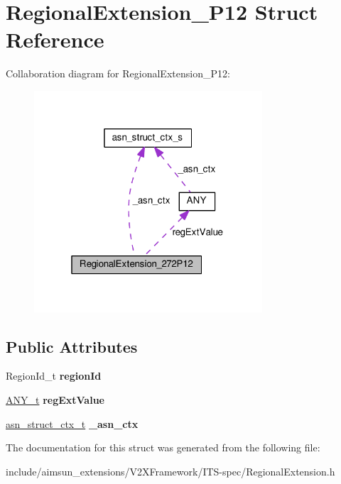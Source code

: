 \hypertarget{structRegionalExtension__272P12}{}\section{Regional\+Extension\+\_\+P12 Struct Reference}
\label{structRegionalExtension__272P12}


Collaboration diagram for Regional\+Extension\+\_\+P12\+:\nopagebreak
\begin{figure}[H]
\begin{center}
\leavevmode
\includegraphics[width=241pt]{structRegionalExtension__272P12__coll__graph}
\end{center}
\end{figure}
\subsection*{Public Attributes}
\begin{DoxyCompactItemize}
\item 
Region\+Id\+\_\+t {\bfseries region\+Id}\hypertarget{structRegionalExtension__272P12_a828c16a3a3567e14b4a5eb7cd425abe1}{}\label{structRegionalExtension__272P12_a828c16a3a3567e14b4a5eb7cd425abe1}

\item 
\hyperlink{structANY}{A\+N\+Y\+\_\+t} {\bfseries reg\+Ext\+Value}\hypertarget{structRegionalExtension__272P12_a123f1e556dc6e0c79d96c2ad8dfef766}{}\label{structRegionalExtension__272P12_a123f1e556dc6e0c79d96c2ad8dfef766}

\item 
\hyperlink{structasn__struct__ctx__s}{asn\+\_\+struct\+\_\+ctx\+\_\+t} {\bfseries \+\_\+asn\+\_\+ctx}\hypertarget{structRegionalExtension__272P12_a0e7a35497aac4feaa1917dcba9755ec3}{}\label{structRegionalExtension__272P12_a0e7a35497aac4feaa1917dcba9755ec3}

\end{DoxyCompactItemize}


The documentation for this struct was generated from the following file\+:\begin{DoxyCompactItemize}
\item 
include/aimsun\+\_\+extensions/\+V2\+X\+Framework/\+I\+T\+S-\/spec/Regional\+Extension.\+h\end{DoxyCompactItemize}
